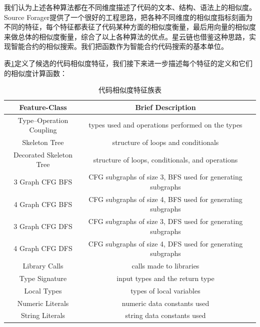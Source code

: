 我们认为上述各种算法都在不同维度描述了代码的文本、结构、语法上的相似度。Source Forager\cite{kashyap2017source}提供了一个很好的工程思路，把各种不同维度的相似度指标刻画为不同的特征，每个特征都表征了代码某种方面的相似度衡量，最后用向量的相似度来做总体的相似度衡量，综合了以上各种算法的优点。星云链也借鉴这种思路，实现智能合约的相似搜索。我们把函数作为智能合约代码搜索的基本单位。

表\ref{table:search-similarity}定义了候选的代码相似度特征，我们接下来进一步描述每个特征的定义和它们的相似度计算函数：


\begin{table}[h]
\centering
\begin{threeparttable}[b]
\caption{代码相似度特征族表}
\label{table:search-similarity}
\begin{tabular}{ccc} \toprule
    {Feature-Class} & {Brief Description} \\ \midrule
Type–Operation Coupling & types used and operations performed on the types \\
Skeleton Tree & structure of loops and conditionals \\
Decorated Skeleton Tree & structure of loops, conditionals, and operations \\
3 Graph CFG BFS & CFG subgraphs of size 3, BFS used for generating subgraphs \\
4 Graph CFG BFS & CFG subgraphs of size 4, BFS used for generating subgraphs \\
3 Graph CFG DFS & CFG subgraphs of size 3, DFS used for generating subgraphs \\
4 Graph CFG DFS & CFG subgraphs of size 4, DFS used for generating subgraphs \\
Library Calls & calls made to libraries \\
Type Signature & input types and the return type \\
Local Types & types of local variables \\
Numeric Literals & numeric data constants used \\
String Literals & string data constants used \\
\bottomrule                                                   
\end{tabular}
\end{threeparttable}
\end{table}

